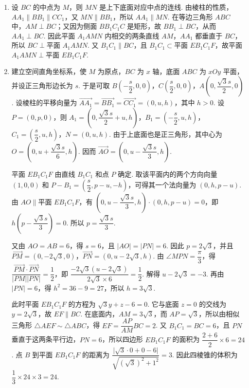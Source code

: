 \begin{solution}
\begin{enumerate}
\item 设 \(BC\) 的中点为 \(M\)，则 \(MN\) 是上下底面对应中点的连线. 由棱柱的性质，\(AA_1\parallel BB_1\parallel CC_1\)，又 \(MN\parallel BB_1\)，所以 \(AA_1\parallel MN\). 在等边三角形 \(ABC\) 中，\(AM\perp BC\)；又因为侧面 \(BB_1C_1C\) 是矩形，故 \(BB_1\perp BC\)，从而 \(AA_1\perp BC\). 因此平面 \(A_1AMN\) 内相交的两条直线 \(AM\)，\(AA_1\) 都垂直于 \(BC\)，所以 \(BC\perp\text{平面 }A_1AMN\). 又 \(B_1C_1\parallel BC\)，且 \(B_1C_1\subset\text{平面 }EB_1C_1F\)，故平面 \(A_1AMN\perp\text{平面 }EB_1C_1F\).
\item 建立空间直角坐标系，使 \(M\) 为原点，\(BC\) 为 \(x\) 轴，底面 \(ABC\) 为 \(xOy\) 平面，并设正三角形边长为 \(s\). 于是可取
\(B\left(-\dfrac s2,0,0\right)\)，\(C\left(\dfrac s2,0,0\right)\)，\(A\left(0,\dfrac{\sqrt3s}{2},0\right)\). 设棱柱的平移向量为 \(\overrightarrow{AA_1}=\overrightarrow{BB_1}=\overrightarrow{CC_1}=(0,u,h)\)，其中 \(h>0\). 设 \(P=(0,p,0)\)，则
\(A_1=(0,\dfrac{\sqrt3s}{2}+u,h)\)，\(B_1=(-\dfrac s2,u,h)\)，\(C_1=(\dfrac s2,u,h)\)，\(N=(0,u,h)\). 由于上底面也是正三角形，其中心为 \(O=(0,u+\dfrac{\sqrt3s}{6},h)\). 因而 \(\overrightarrow{AO}=(0,u-\dfrac{\sqrt3s}{3},h)\).

平面 \(EB_1C_1F\) 由直线 \(B_1C_1\) 和点 \(P\) 确定. 取该平面内的两个方向向量 \((1,0,0)\) 和 \(P-B_1=(\dfrac s2,p-u,-h)\)，可得其一个法向量为 \((0,h,p-u)\). 由 \(AO\parallel\text{平面 }EB_1C_1F\)，有 \((0,u-\dfrac{\sqrt3s}{3},h)\cdot(0,h,p-u)=0\)，即 \(h(p-\dfrac{\sqrt3s}{3})=0\). 所以 \(p=\dfrac{\sqrt3s}{3}\).

又由 \(AO=AB=6\)，得 \(s=6\)，且 \(\lvert AO\rvert=\lvert PN\rvert=6\). 因此 \(p=2\sqrt3\)，并且 \(\overrightarrow{PM}=(0,-2\sqrt3,0)\)，\(\overrightarrow{PN}=(0,u-2\sqrt3,h)\). 由 \(\angle MPN=\dfrac\pi3\)，得
\(\dfrac{\overrightarrow{PM}\cdot\overrightarrow{PN}}{\lvert PM\rvert\lvert PN\rvert}=\dfrac12\)，即 \(\dfrac{-2\sqrt3(u-2\sqrt3)}{2\sqrt3\times6}=\dfrac12\). 解得 \(u-2\sqrt3=-3\). 再由 \(\lvert PN\rvert=6\)，得 \(h^2=36-9=27\)，所以 \(h=3\sqrt3\).

此时平面 \(EB_1C_1F\) 的方程为 \(\sqrt3y+z-6=0\). 它与底面 \(z=0\) 的交线为 \(y=2\sqrt3\)，故 \(EF\parallel BC\). 在底面内，\(AM=3\sqrt3\)，而 \(AP=\sqrt3\)，所以由相似三角形 \(\triangle AEF\sim\triangle ABC\)，得 \(EF=\dfrac{AP}{AM}BC=2\). 又 \(B_1C_1=BC=6\)，且 \(PN\) 垂直于这两条平行边，\(PN=6\)，所以四边形 \(EB_1C_1F\) 的面积为 \(\dfrac{2+6}{2}\times6=24\). 点 \(B\) 到平面 \(EB_1C_1F\) 的距离为 \(\dfrac{\lvert\sqrt3\cdot0+0-6\rvert}{\sqrt{(\sqrt3)^2+1^2}}=3\). 因此四棱锥的体积为 \(\dfrac13\times24\times3=24\).
\end{enumerate}
\end{solution}

